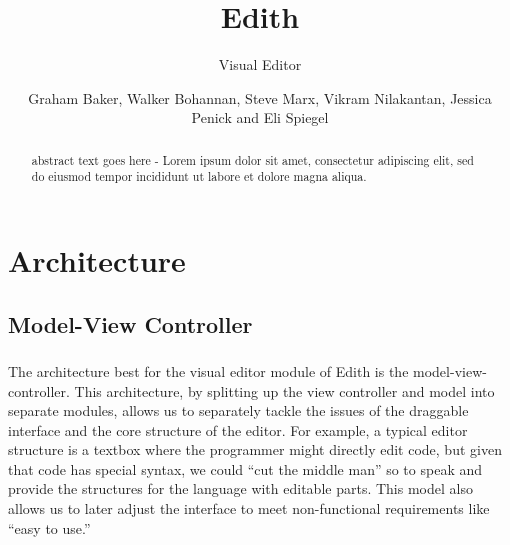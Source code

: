 \documentclass{llncs}
\begin{document}
\title{Edith}


\subtitle{Visual Editor}


\author{Graham Baker, Walker Bohannan, Steve Marx, Vikram Nilakantan, Jessica Penick and Eli Spiegel}








\maketitle

\begin{abstract}
abstract text goes here - Lorem ipsum dolor sit amet, consectetur adipiscing elit, sed do eiusmod tempor incididunt ut labore et dolore magna aliqua.
\end{abstract}

\clearpage

\section{Architecture}

\subsection{Model-View Controller}
\subsubsection{}
The architecture best for the visual editor module of Edith is the model-view-controller. This architecture, by splitting up the view controller and model into separate modules, allows us to separately tackle the issues of the draggable interface and the core structure of the editor. For example, a typical editor structure is a textbox where the programmer might directly edit code, but given that code has special syntax, we could “cut the middle man” so to speak and provide the structures for the language with editable parts. This model also allows us to later adjust the interface to meet non-functional requirements like “easy to use.”
 
\end{document}
